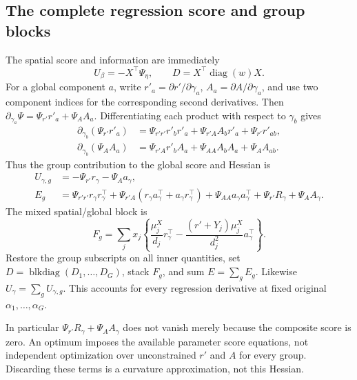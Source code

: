 \documentclass[11pt,a4paper]{article}
\newcommand{\diag}{\operatorname{diag}}
\newcommand{\blkdiag}{\operatorname{blkdiag}}
\numberwithin{equation}{section}
\begin{document}
\subsection{The complete regression score and group blocks}
The spatial score and information are immediately
\begin{equation}
 U_\beta=-X^\top\Psi_\eta,\qquad
 D=X^\top\diag(w)X.
\end{equation}
For a global component $a$, write
$r'_a=\partial r'/\partial\gamma_a$,
$A_a=\partial A/\partial\gamma_a$, and use two component indices
for the corresponding second derivatives. Then
$\partial_{\gamma_a}\Psi=\Psi_{r'}{r'}_a+\Psi_AA_a$.
Differentiating each product with respect to $\gamma_b$ gives
\begin{align}
 \partial_{\gamma_b}(\Psi_{r'}{r'}_a)
 &=\Psi_{{r'}{r'}}{r'}_b{r'}_a+\Psi_{{r'} A}A_b{r'}_a
                                  +\Psi_{r'}{r'}_{ab},\\
 \partial_{\gamma_b}(\Psi_AA_a)
 &=\Psi_{{r'} A}{r'}_bA_a+\Psi_{AA}A_bA_a+\Psi_AA_{ab}.
\end{align}
Thus the group contribution to the global score and Hessian is
\begin{align}
 U_{\gamma,g}&=-\Psi_{r'} r_\gamma-\Psi_Aa_\gamma,\\
 E_g&=\Psi_{{r'}{r'}}r_\gamma r_\gamma^\top
   +\Psi_{{r'} A}(r_\gamma a_\gamma^\top+a_\gamma r_\gamma^\top)
   +\Psi_{AA}a_\gamma a_\gamma^\top
   +\Psi_{r'} R_\gamma+\Psi_A A_\gamma . \label{eq:aggregate-global}
\end{align}
The mixed spatial/global block is
\begin{equation}
 F_g=\sum_jx_j\left\{\frac{\mu_j^X}{d_j}r_\gamma^\top
                 -\frac{({r'}+Y_j)\mu_j^X}{d_j^2}a_\gamma^\top\right\}.
 \label{eq:aggregate-cross}
\end{equation}
Restore the group subscripts on all inner quantities, set
$D=\blkdiag(D_1,\ldots,D_G)$, stack $F_g$, and sum $E=\sum_gE_g$.
Likewise $U_\gamma=\sum_gU_{\gamma,g}$.
This accounts for every regression derivative at fixed original
$\alpha_1,\ldots,\alpha_G$.

In particular $\Psi_{r'} R_\gamma+\Psi_AA_\gamma$ does not vanish
merely because the composite score is zero.
An optimum imposes the available parameter score equations, not
independent optimization over unconstrained ${r'}$ and $A$ for every group.
Discarding these terms is a curvature approximation, not this Hessian.
\end{document}
